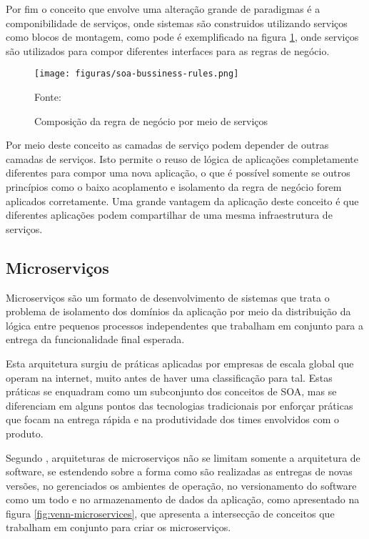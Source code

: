 Por fim o conceito que envolve uma alteração grande de paradigmas é a
componibilidade de serviços, onde sistemas são construidos utilizando serviços
como blocos de montagem, como pode é exemplificado na figura
\ref{fig:soa-bussiness-rules}, onde serviços são utilizados para compor
diferentes interfaces para as regras de negócio.

\begin{figure}[H]
	\centering
	\caption{Composição da regra de negócio por meio de serviços}
	\texttt{[image: figuras/soa-bussiness-rules.png]}

	\label{fig:soa-bussiness-rules}
	\footnotesize Fonte: 
\end{figure}

Por meio deste conceito as camadas de serviço podem depender de outras camadas
de serviços. Isto permite o reuso de lógica de aplicações completamente
diferentes para compor uma nova aplicação, o que é possível somente se outros
princípios como o baixo acoplamento e isolamento da regra de negócio forem
aplicados corretamente. Uma grande vantagem da aplicação deste conceito é
que diferentes aplicações podem compartilhar de uma mesma infraestrutura
de serviços.

\subsection{Microserviços}

Microserviços são um formato de desenvolvimento de sistemas que trata o
problema de isolamento dos domínios da aplicação por meio da distribuição
da lógica entre pequenos processos independentes que trabalham em conjunto
para a entrega da funcionalidade final esperada.

Esta arquitetura surgiu de práticas aplicadas por empresas de escala global que
operam na internet, muito antes de haver uma classificação para tal. Estas
práticas se enquadram como um subconjunto dos conceitos de \ac{SOA}, mas se
diferenciam em alguns pontos das tecnologias tradicionais por enforçar práticas
que focam na entrega rápida e na produtividade dos times envolvidos com
o produto.

Segundo , arquiteturas de microserviços não se limitam
somente a arquitetura de software, se estendendo sobre a forma como são
realizadas as entregas de novas versões, no gerenciados os ambientes
de operação, no versionamento do software como um todo e no armazenamento de
dados da aplicação, como apresentado na figura \ref{fig:venn-microservices},
que apresenta a intersecção de conceitos que trabalham em conjunto para criar
os microserviços.

